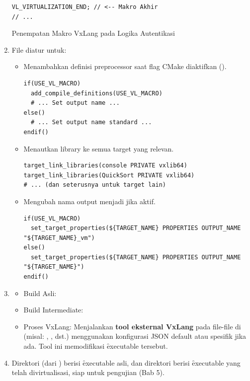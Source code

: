 \begin{enumerate}
\begin{listing}[H]
\begin{verbatim}
VL_VIRTUALIZATION_END; // <-- Makro Akhir
// ...
            \end{verbatim}
		      \caption{Penempatan Makro VxLang pada Logika Autentikasi}
		      \label{lst:vxlang_macro}
	      \end{listing}
	\item {} File  diatur untuk:
	      \begin{itemize}
		      \item Menambahkan definisi preprocessor  saat flag CMake  diaktifkan ().
		            \begin{verbatim}
if(USE_VL_MACRO)
  add_compile_definitions(USE_VL_MACRO)
  # ... Set output name ...
else()
  # ... Set output name standard ...
endif()
                \end{verbatim}
		      \item Menautkan library  ke semua target yang relevan.
		            \begin{verbatim}
target_link_libraries(console PRIVATE vxlib64)
target_link_libraries(QuickSort PRIVATE vxlib64)
# ... (dan seterusnya untuk target lain)
                \end{verbatim}
		      \item Mengubah nama output menjadi  jika  aktif.
		            \begin{verbatim}
if(USE_VL_MACRO)
  set_target_properties(${TARGET_NAME} PROPERTIES OUTPUT_NAME "${TARGET_NAME}_vm")
else()
  set_target_properties(${TARGET_NAME} PROPERTIES OUTPUT_NAME "${TARGET_NAME}")
endif()
                \end{verbatim}
	      \end{itemize}
	\item {}
	      \begin{itemize}
		      \item Build Asli: 
		      \item Build Intermediate: 
		      \item Proses VxLang: Menjalankan \textbf{tool eksternal VxLang} pada file-file di  (misal: , , dst.) menggunakan konfigurasi JSON default atau spesifik jika ada. Tool ini memodifikasi \f{executable} tersebut.
	      \end{itemize}
	\item {} Direktori  (dari ) berisi \f{executable} asli, dan direktori  berisi \f{executable} yang telah divirtualisasi, siap untuk pengujian (Bab 5).
\end{enumerate}
